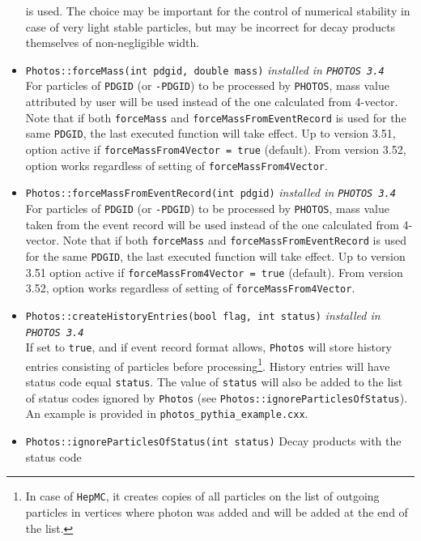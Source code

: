 \documentclass[]{Photos_interface_design}
\begin{document}
\begin{itemize}
        is used. The choice may be important for the control 
        of numerical stability in case of very light stable particles, but may be incorrect for decay products 
        themselves of non-negligible width.
  \item {\tt Photos::forceMass(int pdgid, double mass)} {\it  installed in {\tt PHOTOS 3.4}} \\
        For particles of {\tt PDGID} (or {\tt -PDGID})  to be processed by {\tt PHOTOS},
        mass value attributed  by user will be used instead of the one calculated
        from 4-vector. Note that if both {\tt forceMass} and {\tt forceMassFromEventRecord} is
        used for the same {\tt PDGID}, the last executed function will take effect.
        Up to version 3.51, option active if {\tt forceMassFrom4Vector = true} (default).
        From version 3.52, option works regardless of setting of {\tt forceMassFrom4Vector}.
  \item {\tt Photos::forceMassFromEventRecord(int pdgid)} {\it  installed in {\tt PHOTOS 3.4}} \\
        For particles of {\tt PDGID} (or {\tt -PDGID}) to be  processed by {\tt PHOTOS},
        mass value taken from the event record will be used instead of the one
        calculated from 4-vector. Note that if both {\tt forceMass} and {\tt forceMassFromEventRecord} is
        used for the same {\tt PDGID}, the last executed function will take effect.
        Up to version 3.51 option active if {\tt forceMassFrom4Vector = true} (default).
        From version 3.52, option works regardless of setting of {\tt forceMassFrom4Vector}.
  \item {\tt Photos::createHistoryEntries(bool flag, int status)} {\it  installed in {\tt PHOTOS 3.4}} \\
        If set to {\tt true}, and if event record format allows,
        {\tt Photos} will store history entries consisting of particles
        before processing\footnote{In case of {\tt HepMC}, it creates copies
        of all particles on the list of outgoing particles in vertices where
        photon was added and will be added at the end of the list.}.
        History entries will have status code equal {\tt status}.
        The value of {\tt status} will also be added to the list of status
        codes ignored by {\tt Photos} (see {\tt Photos::ignoreParticlesOfStatus}).
        An example is provided in  {\tt photos\_pythia\_example.cxx}.
  \item {\tt Photos::ignoreParticlesOfStatus(int status)} Decay products with the status code

\end{itemize}
\end{document}
